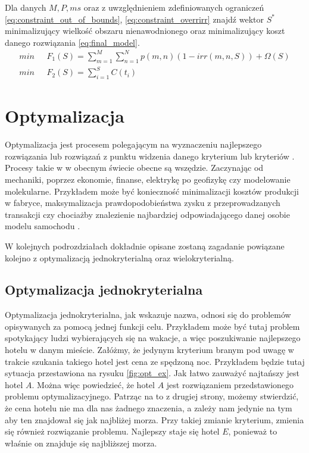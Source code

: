 \documentclass[twoside]{iisthesis}
\begin{document}
Dla danych $M, P, ms$ oraz z uwzględnieniem zdefiniowanych ograniczeń \eqref{eq:constraint_out_of_bounds}, \eqref{eq:constraint_overrirr} znajdź wektor $S^{*}$ minimalizujący wielkość obszaru nienawodnionego oraz minimalizujący koszt danego rozwiązania \eqref{eq:final_model}.
\begin{equation}\label{eq:final_model}
	\begin{split}
		min \text{  }&  F_{1}(S) = \sum_{m=1}^{M}\sum_{n=1}^{N} p(m,n) (1 - irr(m,n,S)) + \Omega(S)\\
		min \text{  }&	F_{2}(S) = \sum_{i=1}^{S} C(t_{i})
	\end{split}
\end{equation}

\chapter{Optymalizacja}
Optymalizacja jest procesem polegającym na wyznaczeniu najlepszego rozwiązania lub rozwiązań z punktu widzenia danego kryterium lub kryteriów \cite{wiki_optimization}. Procesy takie w w obecnym świecie obecne są wszędzie. Zaczynając od mechaniki, poprzez ekonomie, finanse, elektrykę po geofizykę czy modelowanie molekularne. Przykładem może być konieczność minimalizacji kosztów produkcji w fabryce, maksymalizacja prawdopodobieństwa zysku z przeprowadzanych transakcji czy chociażby znalezienie najbardziej odpowiadającego danej osobie modelu samochodu \cite{wiki_pl_optimization}.

W kolejnych podrozdziałach dokładnie opisane zostaną zagadanie powiązane kolejno z optymalizacją jednokryterialną oraz wielokryterialną.
\section{Optymalizacja jednokryterialna}
Optymalizacja jednokryterialna, jak wskazuje nazwa, odnosi się do problemów opisywanych za pomocą jednej funkcji celu. Przykładem może być tutaj problem spotykający ludzi wybierających się na wakacje, a więc poszukiwanie najlepszego hotelu w danym mieście. Załóżmy, że jedynym kryterium branym pod uwagę w trakcie szukania takiego hotel jest cena ze spędzoną noc. Przykładem będzie tutaj sytuacja przestawiona na rysuku \eqref{fig:opt_ex}. Jak łatwo zauważyć najtańszy jest hotel $A$. Można więc powiedzieć, że hotel $A$ jest rozwiązaniem przedstawionego problemu optymalizacyjnego. Patrząc na to z drugiej strony, możemy stwierdzić, że cena hotelu nie ma dla nas żadnego znaczenia, a zależy nam jedynie na tym aby ten znajdował się jak najbliżej morza. Przy takiej zmianie kryterium, zmienia się również rozwiązanie problemu. Najlepszy staje się hotel $E$, ponieważ to właśnie on znajduje się najbliższej morza.
\end{document}

